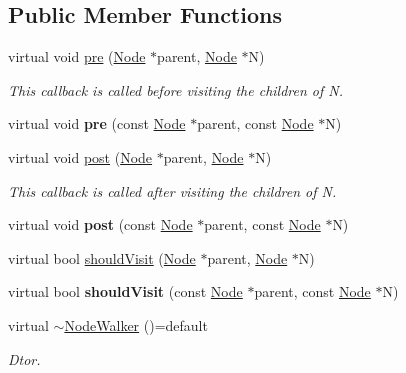 \subsection*{Public Member Functions}
\begin{DoxyCompactItemize}
\item 
\mbox{\label{classglow_1_1_node_walker_a9a56569c7d0cbb178dc529fdd50d40ea}} 
virtual void \hyperlink{classglow_1_1_node_walker_a9a56569c7d0cbb178dc529fdd50d40ea}{pre} (\hyperlink{classglow_1_1_node}{Node} $\ast$parent, \hyperlink{classglow_1_1_node}{Node} $\ast$N)
\begin{DoxyCompactList}\small\item\em This callback is called before visiting the children of {\ttfamily N}. \end{DoxyCompactList}\item 
\mbox{\label{classglow_1_1_node_walker_a458185932e62fcb94c46be5ec2f9c05e}} 
virtual void {\bfseries pre} (const \hyperlink{classglow_1_1_node}{Node} $\ast$parent, const \hyperlink{classglow_1_1_node}{Node} $\ast$N)
\item 
\mbox{\label{classglow_1_1_node_walker_a73b1dd6252113a9ebbe94dc956004512}} 
virtual void \hyperlink{classglow_1_1_node_walker_a73b1dd6252113a9ebbe94dc956004512}{post} (\hyperlink{classglow_1_1_node}{Node} $\ast$parent, \hyperlink{classglow_1_1_node}{Node} $\ast$N)
\begin{DoxyCompactList}\small\item\em This callback is called after visiting the children of {\ttfamily N}. \end{DoxyCompactList}\item 
\mbox{\label{classglow_1_1_node_walker_ab6a7ffd507136e91b032773ece8af230}} 
virtual void {\bfseries post} (const \hyperlink{classglow_1_1_node}{Node} $\ast$parent, const \hyperlink{classglow_1_1_node}{Node} $\ast$N)
\item 
virtual bool \hyperlink{classglow_1_1_node_walker_a33532d7a4fe24f71c1b763c53182b20b}{should\+Visit} (\hyperlink{classglow_1_1_node}{Node} $\ast$parent, \hyperlink{classglow_1_1_node}{Node} $\ast$N)
\item 
\mbox{\label{classglow_1_1_node_walker_a5e2f69eaa9a50fbb4319d37726e6b867}} 
virtual bool {\bfseries should\+Visit} (const \hyperlink{classglow_1_1_node}{Node} $\ast$parent, const \hyperlink{classglow_1_1_node}{Node} $\ast$N)
\item 
\mbox{\label{classglow_1_1_node_walker_a7f5b4d28ff8e36c508c5a9d5971ba5a5}} 
virtual \hyperlink{classglow_1_1_node_walker_a7f5b4d28ff8e36c508c5a9d5971ba5a5}{$\sim$\+Node\+Walker} ()=default
\begin{DoxyCompactList}\small\item\em Dtor. \end{DoxyCompactList}\end{DoxyCompactItemize}


